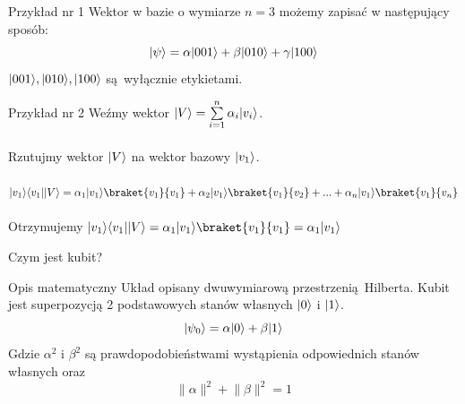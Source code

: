 \documentclass{beamer}
\DeclarePairedDelimiter\bra{\langle}{\rvert}
\DeclarePairedDelimiter\ket{\lvert}{\rangle}
\begin{document}
	\begin{frame}
		\begin{block}{Przykład nr 1}
			\vspace{0.5em}
			Wektor w bazie o wymiarze $n=3$ możemy zapisać w następujący sposób:
				\begin{equation*}
					\ket{\psi} = \alpha\ket{001} + \beta\ket{010} + \gamma\ket{100}
				\end{equation*}
			$\ket{001},\ket{010},\ket{100}$ są wyłącznie etykietami.
			
			\vspace{0.5em}
		\end{block}
	
		\begin{block}{Przykład nr 2}
			\vspace{0.5em}
			Weźmy wektor  $\ket{V} = \sum\limits_{i=1}^n \alpha_{i}\ket{v_{i}}$.\\~\\
			Rzutujmy wektor $\ket{V}$ na wektor bazowy $\ket{v_{1}}$.\\~\\
			$\ket{v_{1}}\bra{v_{1}}\ket{V}=
			\alpha_{1}\ket{v_{1}}\braket{v_{1}}{v_{1}} +
			 \alpha_{2}\ket{v_{1}}\braket{v_{1}}{v_{2}} +...+
			 \alpha_{n}\ket{v_{1}}\braket{v_{1}}{v_{n}} 
			$\\~\\
			Otrzymujemy $\ket{v_{1}}\bra{v_{1}}\ket{V}= \alpha_{1}\ket{v_{1}}\braket{v_{1}}{v_{1}}=\alpha_{1}\ket{v_{1}}$
			
			\vspace{0.5em}
		\end{block}
	\end{frame}
			
	\begin{frame}{Czym jest kubit?}
		
		\begin{block}{Opis matematyczny}
		\vspace{0.5em}
		Układ opisany dwuwymiarową przestrzenią Hilberta. Kubit jest superpozycją 2 podstawowych stanów własnych $\ket{0}$ i $\ket{1}$.\\
		\begin{equation*}
			\ket{\psi_{0}} = \alpha\ket{0} + \beta\ket{1}
		\end{equation*}
		Gdzie $\alpha^{2}$ i $\beta^{2}$ są prawdopodobieństwami wystąpienia odpowiednich stanów własnych oraz $$\lVert\alpha\rVert^{2} + \lVert\beta\rVert^{2} = 1$$
		
		\vspace{0.5em}
		\end{block}			
	\end{frame}
\end{document}
